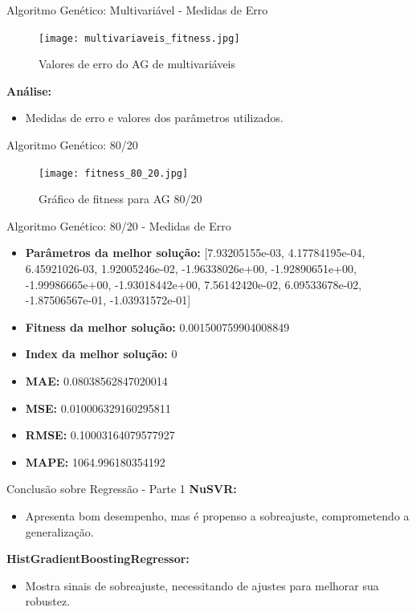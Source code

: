 \documentclass{beamer}
\begin{document}
\begin{frame}{Algoritmo Genético: Multivariável - Medidas de Erro}
    \begin{figure}[H]
        \centering
        \texttt{[image: multivariaveis\_fitness.jpg]}
        \caption{Valores de erro do AG de multivariáveis}
    \end{figure}
    \textbf{Análise:}
    \begin{itemize}
        \item Medidas de erro e valores dos parâmetros utilizados.
    \end{itemize}
\end{frame}

\begin{frame}{Algoritmo Genético: 80/20}
    \begin{figure}[H]
        \centering
        \texttt{[image: fitness\_80\_20.jpg]}
        \caption{Gráfico de fitness para AG 80/20}
    \end{figure}
\end{frame}

\begin{frame}{Algoritmo Genético: 80/20 - Medidas de Erro}
    \begin{itemize}
        \item \textbf{Parâmetros da melhor solução:} [7.93205155e-03, 4.17784195e-04, 6.45921026-03, 1.92005246e-02, -1.96338026e+00, -1.92890651e+00, -1.99986665e+00, -1.93018442e+00, 7.56142420e-02, 6.09533678e-02, -1.87506567e-01, -1.03931572e-01]
        \item \textbf{Fitness da melhor solução:} 0.001500759904008849
        \item \textbf{Index da melhor solução:} 0
        \item \textbf{MAE:} 0.08038562847020014
        \item \textbf{MSE:} 0.010006329160295811
        \item \textbf{RMSE:} 0.10003164079577927
        \item \textbf{MAPE:} 1064.996180354192
    \end{itemize}
\end{frame}
\begin{frame}{Conclusão sobre Regressão - Parte 1}
    \textbf{NuSVR:}
    \begin{itemize}
        \item Apresenta bom desempenho, mas é propenso a sobreajuste, comprometendo a generalização.
    \end{itemize}

    \textbf{HistGradientBoostingRegressor:}
    \begin{itemize}
        \item Mostra sinais de sobreajuste, necessitando de ajustes para melhorar sua robustez.
    \end{itemize}
\end{frame}
\end{document}
